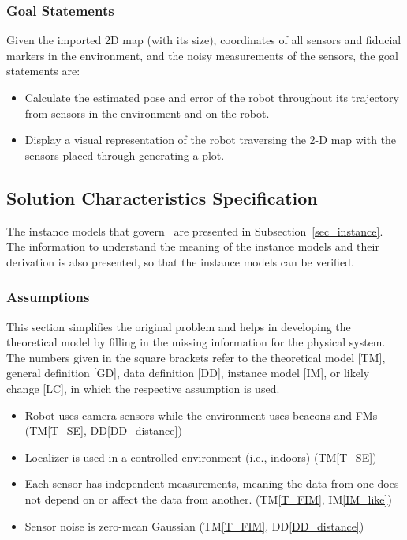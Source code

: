 \documentclass[12pt]{article}
\newcommand{\ddref}[1]{DD\ref{#1}}
\newcommand{\tref}[1]{TM\ref{#1}}
\newcounter{assumpnum} %
\newcounter{goalnum} %
\newcommand{\iref}[1]{IM\ref{#1}}
\begin{document}
\subsubsection{Goal Statements}

\noindent Given the imported 2D map (with its size), coordinates of all sensors and fiducial markers in the environment, and the noisy measurements of the sensors, the goal statements are:

\begin{itemize}

\item[GS\refstepcounter{goalnum}1\label{GS1}:] Calculate the estimated pose and error of the robot throughout its trajectory from sensors in the environment and on the robot.
\item[GS\refstepcounter{goalnum}2\label{GS2}:] Display a visual representation of the robot traversing the 2-D map with the sensors placed through generating a plot.

\end{itemize}

\subsection{Solution Characteristics Specification}

The instance models that govern \progname~are presented in
Subsection~\ref{sec_instance}.  The information to understand the meaning of the
instance models and their derivation is also presented, so that the instance
models can be verified.

\subsubsection{Assumptions}\label{sec_assumpt}


This section simplifies the original problem and helps in developing the
theoretical model by filling in the missing information for the physical system.
The numbers given in the square brackets refer to the theoretical model [TM],
general definition [GD], data definition [DD], instance model [IM], or likely
change [LC], in which the respective assumption is used.

\begin{itemize}

\item[A\refstepcounter{assumpnum}1 \label{A_sensors}:]Robot uses camera sensors while the environment uses beacons and FMs (\tref{T_SE}, \ddref{DD_distance})
\item[A\refstepcounter{assumpnum}2 \label{A_controlled}:]Localizer is used in a controlled environment (i.e., indoors) (\tref{T_SE})
\item[A\refstepcounter{assumpnum}3 \label{A_indep}:]Each sensor has independent measurements, meaning the data from one does not depend on or affect the data from another. (\tref{T_FIM}, \iref{IM_like})
\item[A\refstepcounter{assumpnum}4 \label{A_noise}:]Sensor noise is zero-mean Gaussian (\tref{T_FIM}, \ddref{DD_distance})


\end{itemize}
\end{document}
